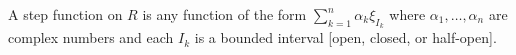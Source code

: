 A step function on $R$ is any function of the form $\sum_{k=1}^{n} \alpha_k \xi_{I_k}$ where $\alpha_1, \ldots, \alpha_n$ are complex numbers and each $I_k$ is a bounded interval [open, closed, or half-open].